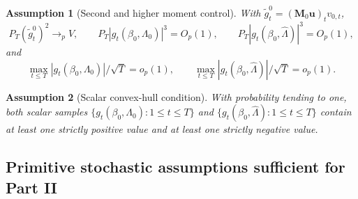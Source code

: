 \documentclass[12pt]{article}
\numberwithin{equation}{section}
\newtheorem{assumption}{Assumption}
\theoremstyle{definition}
\newcommand{\op}{o_p}
\newcommand{\Op}{O_p}
\begin{document}
\begin{assumption}[Second and higher moment control]
\label{ass:moment-control}
With \(\tilde g_t^0=(\bm M_0\bm u)_t v_{0,t}\),
\[
    P_T(\tilde g_t^0)^2\to_p V,
    \qquad
    P_T|g_t(\beta_0,\Lambda_0)|^3=\Op(1),
    \qquad
    P_T|g_t(\beta_0,\widehat\Lambda)|^3=\Op(1),
\]
and
\[
    \max_{t\le T}|g_t(\beta_0,\Lambda_0)|/\sqrt T=\op(1),
    \qquad
    \max_{t\le T}|g_t(\beta_0,\widehat\Lambda)|/\sqrt T=\op(1).
\]
\end{assumption}

\begin{assumption}[Scalar convex-hull condition]
\label{ass:convex-hull}
With probability tending to one, both scalar samples
\(\{g_t(\beta_0,\Lambda_0):1\le t\le T\}\) and
\(\{g_t(\beta_0,\widehat\Lambda):1\le t\le T\}\) contain at least one strictly
positive value and at least one strictly negative value.
\end{assumption}

\subsection{Primitive stochastic assumptions sufficient for Part II}
\end{document}
